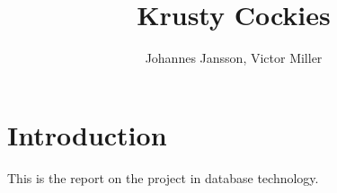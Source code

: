 \documentclass[a4paper]{scrartcl}
\numberwithin{equation}{section}
\begin{document}
\title{Krusty Cockies}
\author{Johannes Jansson, Victor Miller}



\maketitle

\section*{Introduction}

This is the report on the project in database technology.

\sec

% 






    

\end{document}
